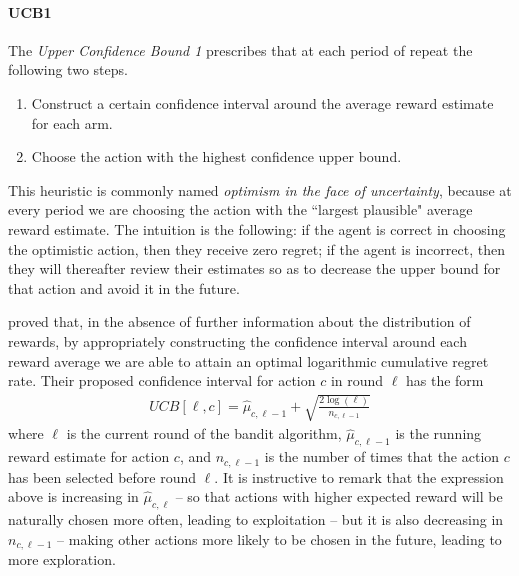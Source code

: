 \begin{itemize}
\paragraph{UCB1} The \emph{Upper Confidence Bound 1} prescribes that at each period of repeat the following two steps.
\begin{enumerate}
    \item Construct a certain confidence interval around the average reward estimate for each arm. 
    \item Choose the action with the highest confidence upper bound.
\end{enumerate}

This heuristic is commonly named \emph{optimism in the face of uncertainty}\citet{kaelbling1996reinforcement}, because at every period we are choosing the action with the ``largest plausible"\cite[Ch. 3]{lattimore2018bandits} average reward estimate. The intuition is the following: if the agent is correct in choosing the optimistic action, then they receive zero regret; if the agent is incorrect, then they will thereafter review their estimates so as to decrease the upper bound for that action and avoid it in the future. 

\cite{auer2002finite} proved that, in the absence of further information about the distribution of rewards, by appropriately constructing the confidence interval around each reward average we are able to attain an optimal logarithmic cumulative regret rate. Their proposed confidence interval for action $c$ in round $\ell$ has the form
\begin{align}
UCB[\ell, c] = \hat{\mu}_{c,\ell-1} + \sqrt{\frac{2\log(\ell)}{n_{c,\ell-1}} }   
\end{align}
\noindent where $\ell$ is the current round of the bandit algorithm, $\hat{\mu}_{c,\ell-1}$ is the running reward estimate for action $c$, and $n_{c,\ell-1}$ is the number of times that the action $c$ has been selected before round $\ell$. It is instructive to remark that the expression above is increasing in $\hat{\mu}_{c,\ell}$ -- so that actions with higher expected reward will be naturally chosen more often, leading to exploitation -- but it is also decreasing in $n_{c,\ell-1}$ -- making other actions more likely to be chosen in the future, leading to more exploration. 


\end{itemize}
